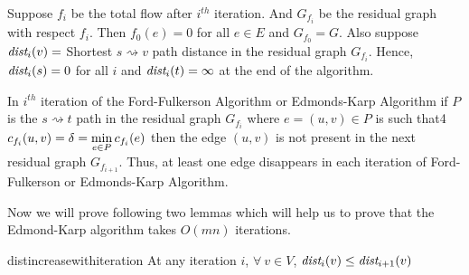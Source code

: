 Suppose $f_i$ be the total flow after $i^{th}$ iteration. And $G_{f_i}$ be the residual graph with respect $f_i$. Then $f_0(e)=0$ for all $e\in E$ and $G_{f_0}=G$. Also suppose $\emph{dist}_i(v)=$ Shortest $s\rightsquigarrow v$ path distance in the residual graph $G_{f_i}$. Hence, $\emph{dist}_i(s)=0$ for all $i$ and $\emph{dist}_i(t)=\infty$ at the end of the algorithm.
\begin{note}
	In $i^{th}$ iteration of the Ford-Fulkerson Algorithm or Edmonds-Karp Algorithm if $P$ is the $s\rightsquigarrow t$ path in the residual graph $G_{f_i}$ where $e=(u,v)\in P$  is such that4 $c_{f_i}(u,v)=\delta=\min\limits_{e\in P}c_{f_i}(e)$ then the edge $(u,v)$ is not present in the next residual graph $G_{f_{i+1}}$. Thus, at least one edge disappears in each iteration of Ford-Fulkerson or Edmonds-Karp Algorithm.
\end{note}
Now we will prove following two lemmas which will help us to prove that the Edmond-Karp algorithm takes $O(mn)$ iterations.
\begin{lemma}{}{distincreasewithiteration}
	At any iteration $i$, 	$\forall\ v\in V$, $\emph{dist}_i(v)\leq\emph{dist}_{i+1}(v)$
\end{lemma}
